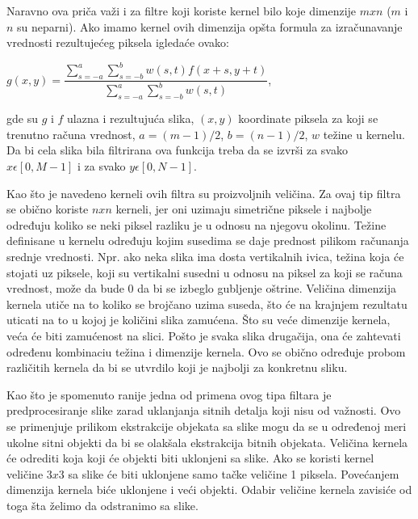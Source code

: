 \documentclass[a4paper,12pt,titlepage]{article}
\begin{document}
Naravno ova priča važi i za filtre koji koriste kernel bilo koje dimenzije $m x n$ ($m$ i $n$ su neparni). Ako imamo kernel ovih dimenzija opšta formula za izračunavanje vrednosti rezultujećeg piksela igledaće ovako: 

\begin{center}
$g(x, y) = \dfrac{\sum_{s = -a}^{a} \sum_{s = -b}^{b} w(s, t)f(x + s, y + t)}{\sum_{s = -a}^{a} \sum_{s = -b}^{b} w(s, t)}$,  \\
\end{center}

gde su $g$ i $f$ ulazna i rezultujuća slika, $(x, y)$ koordinate piksela za koji se trenutno računa vrednost, $a = (m - 1) / 2$, $b = (n - 1) / 2$, $w$ težine u kernelu. Da bi cela slika bila filtrirana ova funkcija treba da se izvrši za svako $x \epsilon [0, M - 1]$ i za svako $y \epsilon [0, N - 1]$. 

Kao što je navedeno kerneli ovih filtra su proizvoljnih veličina. Za ovaj tip filtra se obično koriste $n x n$ kerneli, jer oni uzimaju simetrične piksele i najbolje određuju koliko se neki piksel razliku je u odnosu na njegovu okolinu. Težine definisane u kernelu određuju kojim susedima se daje prednost pilikom računanja srednje vrednosti. Npr. ako neka slika ima dosta vertikalnih ivica, težina koja će stojati uz piksele, koji su vertikalni susedni u odnosu na piksel za koji se računa vrednost, može da bude 0 da bi se izbeglo gubljenje oštrine. Veličina dimenzija kernela utiče na to koliko se brojčano uzima suseda, što će na krajnjem rezultatu uticati na to u kojoj je količini slika zamućena. Što su veće dimenzije kernela, veća će biti zamućenost na slici. Pošto je svaka slika drugačija, ona će zahtevati određenu kombinaciu težina i dimenzije kernela. Ovo se obično određuje probom različitih kernela da bi se utvrdilo koji je najbolji za konkretnu sliku. 

Kao što je spomenuto ranije jedna od primena ovog tipa filtara je predprocesiranje slike zarad uklanjanja sitnih detalja koji nisu od važnosti. Ovo se primenjuje prilikom ekstrakcije objekata sa slike mogu da se u određenoj meri ukolne sitni objekti da bi se olakšala ekstrakcija bitnih objekata. Veličina kernela će odrediti koja koji će objekti biti uklonjeni sa slike. Ako se koristi kernel veličine $3 x 3$ sa slike će biti uklonjene samo tačke veličine 1 piksela. Povećanjem dimenzija kernela biće uklonjene i veći objekti. Odabir veličine kernela zavisiće od toga šta želimo da odstranimo sa slike.
\end{document}
